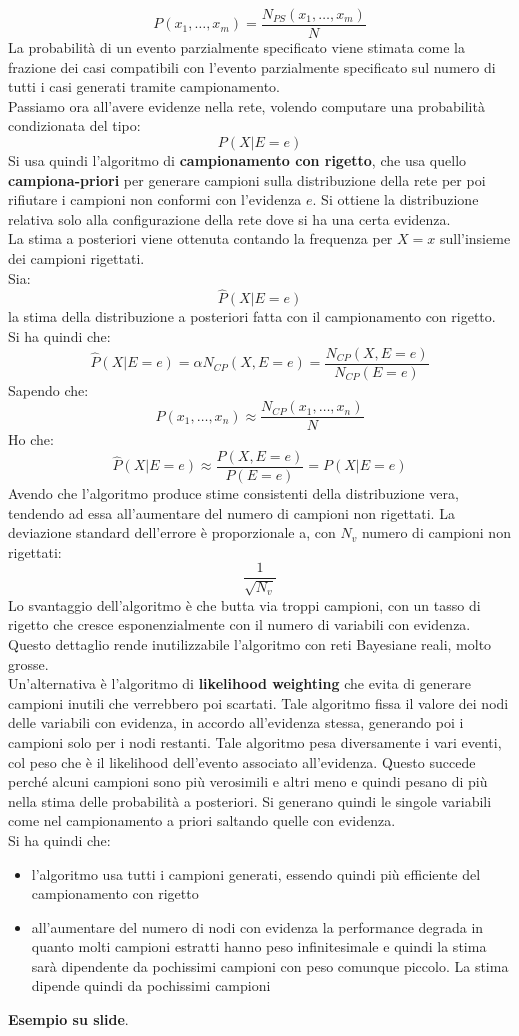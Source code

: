 \message{ !name(modprob.tex)}\documentclass[a4paper,12pt, oneside]{book}
\begin{document}
\[P(x_1,\ldots,x_m)=\frac{N_{PS}(x_1,\ldots,x_m)}{N}\]
La probabilità di un evento parzialmente specificato viene stimata come la
frazione dei casi compatibili con l’evento parzialmente specificato sul numero
di tutti i casi generati tramite campionamento. \\
Passiamo ora all'avere evidenze nella rete, volendo computare una probabilità
condizionata del tipo: 
\[P(X|E=e)\]
Si usa quindi l'algoritmo di \textbf{campionamento con rigetto}, che usa quello
\textbf{campiona-priori} per generare campioni sulla distribuzione della rete
per poi rifiutare i campioni non conformi con l'evidenza $e$. Si ottiene la
distribuzione relativa solo alla configurazione della rete dove si ha una certa
evidenza.\\ 
La stima a posteriori viene ottenuta contando la frequenza per $X=x$
sull'insieme dei campioni rigettati.\\
Sia:
\[\hat{P}(X|E=e)\]
la stima della distribuzione a posteriori fatta con il campionamento con
rigetto.\\ 
Si ha quindi che:
\[\hat{P}(X|E=e)=\alpha N_{CP}(X,E=e)=\frac{N_{CP}(X,E=e)}{N_{CP}(E=e)}\]
Sapendo che:
\[P(x_1,\ldots,x_n)\approx\frac{N_{CP}(x_1,\ldots,x_n)}{N}\]
Ho che:
\[\hat{P}(X|E=e)\approx\frac{P(X,E=e)}{P(E=e)}=P(X|E=e)\]
Avendo che l'algoritmo produce stime consistenti della distribuzione vera,
tendendo ad essa all'aumentare del numero di campioni non rigettati. La
deviazione standard dell'errore è proporzionale a, con $N_v$ numero di campioni
non rigettati:
\[\frac{1}{\sqrt{N_v}}\]
Lo svantaggio dell'algoritmo è che butta via troppi campioni, con un tasso di
rigetto che cresce esponenzialmente con il numero di variabili con
evidenza. Questo dettaglio rende inutilizzabile l'algoritmo con reti Bayesiane
reali, molto grosse.\\
Un'alternativa è l'algoritmo di \textbf{likelihood weighting} che evita di
generare campioni inutili che verrebbero poi scartati. Tale algoritmo fissa il
valore dei nodi delle variabili con evidenza, in accordo all'evidenza stessa,
generando poi i campioni solo per i nodi restanti. Tale algoritmo pesa
diversamente i vari eventi, col peso che è il likelihood dell'evento associato
all'evidenza. Questo succede perché alcuni campioni sono più verosimili e altri
meno e quindi pesano di più nella stima delle probabilità a posteriori. Si
generano quindi le singole variabili come nel 
campionamento a priori saltando quelle con evidenza.\\ 
Si ha quindi che:
\begin{itemize}
  \item l'algoritmo usa tutti i campioni generati, essendo quindi più efficiente
  del campionamento con rigetto
  \item all'aumentare del numero di nodi con evidenza la performance degrada in
  quanto molti campioni estratti hanno peso infinitesimale e quindi la stima
  sarà dipendente da pochissimi campioni con peso comunque piccolo. La stima
  dipende quindi da pochissimi campioni
\end{itemize}
\textbf{Esempio su slide}.
\end{document}
